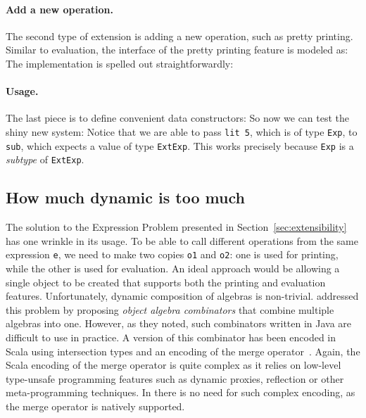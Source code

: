 \paragraph{Add a new operation.} The second type of extension is adding a new
operation, such as pretty printing. Similar to evaluation, the interface of the
pretty printing feature is modeled as:
The implementation is spelled out straightforwardly:


\paragraph{Usage.} The last piece is to define convenient data constructors:
So now we can test the shiny new system:
Notice that we are able to pass \lstinline{lit 5}, which is of type
\lstinline{Exp}, to \lstinline{sub}, which expects a value of type
\lstinline{ExtExp}. This works precisely because \lstinline{Exp} is a
\textit{subtype} of \lstinline{ExtExp}.



\subsection{How much dynamic is too much}
\label{sec:dynamic}

The solution to the Expression Problem presented in
Section~\ref{sec:extensibility} has one wrinkle in its usage. To be able to call
different operations from the same expression \lstinline{e}, we need to make two
copies \lstinline{o1} and \lstinline{o2}: one is used for printing, while the
other is used for evaluation. An ideal approach would be allowing a single object
to be created that supports both the printing and evaluation features.
Unfortunately, dynamic composition of algebras is non-trivial.
\citet{oliveira2012extensibility} addressed this problem by proposing
\textit{object algebra combinators} that combine multiple algebras into one.
However, as they noted, such combinators written in Java are difficult to use in
practice. A version of this combinator has been encoded in Scala using
intersection types and an encoding of the merge
operator~\cite{oliveira2013feature, rendel14attributes}. Again, the Scala
encoding of the merge operator is quite complex as it relies on low-level
type-unsafe programming features such as dynamic proxies, reflection or other
meta-programming techniques. In \name there is no need for such complex
encoding, as the merge operator is natively supported.

